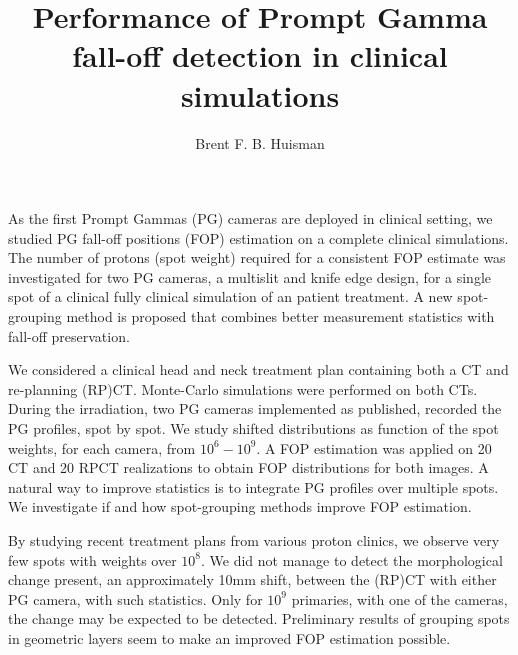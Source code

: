 \documentclass[11pt]{article}
\title{\textbf{Performance of Prompt Gamma fall-off detection in clinical simulations}}
\author{Brent F. B. Huisman}
\date{}
\begin{document}
\maketitle


As the first Prompt Gammas (PG) cameras are deployed in clinical setting, we studied PG fall-off positions (FOP) estimation on a complete clinical simulations. The number of protons (spot weight) required for a consistent FOP estimate was investigated for two PG cameras, a multislit and knife edge design, for a single spot of a clinical fully clinical simulation of an patient treatment. A new spot-grouping method is proposed that combines better measurement statistics with fall-off preservation.

We considered a clinical head and neck treatment plan containing both a CT and re-planning (RP)CT. Monte-Carlo simulations were performed on both CTs. During the irradiation, two PG cameras implemented as published, recorded the PG profiles, spot by spot. We study shifted distributions as function of the spot weights, for each camera, from $10^6-10^9$. A FOP estimation was applied on 20 CT and 20 RPCT realizations to obtain FOP distributions for both images. A natural way to improve statistics is to integrate PG profiles over multiple spots. We investigate if and how spot-grouping methods improve FOP estimation.

By studying recent treatment plans from various proton clinics, we observe very few spots with weights over $10^8$. We did not manage to detect the morphological change present, an approximately 10mm shift, between the (RP)CT with either PG camera, with such statistics. Only for $10^9$ primaries, with one of the cameras, the change may be expected to be detected. Preliminary results of grouping spots in geometric layers seem to make an improved FOP estimation possible.
\end{document}
